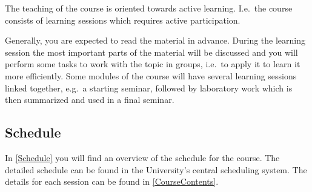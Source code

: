 The teaching of the course is oriented towards active learning.
I.e.\ the course consists of learning sessions which requires active 
participation.

Generally, you are expected to read the material in advance.
During the learning session the most important parts of the material will be 
discussed and you will perform some tasks to work with the topic in groups, 
i.e.\ to apply it to learn it more efficiently.
Some modules of the course will have several learning sessions linked together,
e.g.\ a starting seminar, followed by laboratory work which is then summarized 
and used in a final seminar.

\subsection{Schedule}

In \cref{Schedule} you will find an overview of the schedule for the course.
The detailed schedule can be found in the University's central scheduling 
system.
The details for each session can be found in \cref{CourseContents}.

